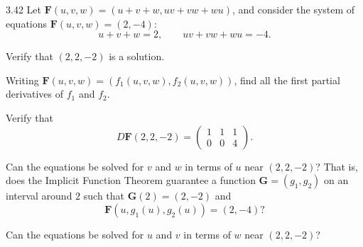 \documentclass[11pt,oneside]{article}
\begin{document}
\begin{problem}{3.42}
Let $\mathbf F(u,v,w)=(u+v+w,uv+vw+wu)$, and consider the system of equations $\mathbf F(u,v,w)=(2,-4)$:
\[
    u+v+w=2,
    \qquad
    uv+vw+wu=-4.
\]
\begin{problemsubparts}
    \item Verify that $(2,2,-2)$ is a solution.
    \item Writing $\mathbf F(u,v,w)=(f_1(u,v,w),f_2(u,v,w))$, find all the first partial derivatives of $f_1$ and $f_2$.
    \item Verify that
    \[
        D\mathbf F(2,2,-2)=\begin{pmatrix}1&1&1\\0&0&4\end{pmatrix}.
    \]
    \item Can the equations be solved for $v$ and $w$ in terms of $u$ near $(2,2,-2)$? That is, does the Implicit Function Theorem guarantee a function $\mathbf G=(g_1,g_2)$ on an interval around $2$ such that $\mathbf G(2)=(2,-2)$ and
    \[
        \mathbf F(u,g_1(u),g_2(u))=(2,-4)?
    \]
    \item Can the equations be solved for $u$ and $v$ in terms of $w$ near $(2,2,-2)$?
\end{problemsubparts}
\end{problem}
\end{document}
